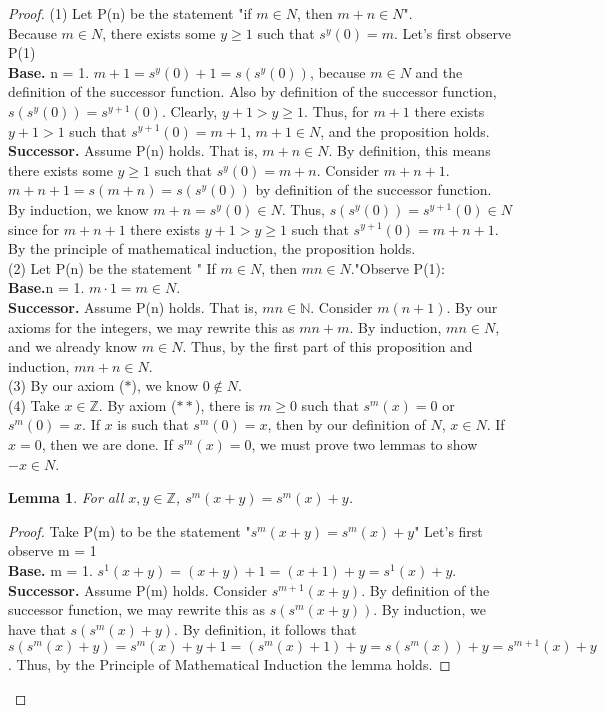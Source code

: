 \documentclass[12pt]{amsart}
\newcommand{\N}{\mathbb{N}}
\newcommand{\Z}{\mathbb{Z}}
\begin{document}
\begin{proof}
	(1) Let P(n) be the statement "if $m \in N$, then $m + n \in N$".\\Because $m \in N$, there exists some $y \geq 1$ such that $ s^y(0) = m$. Let's first observe P(1)
	\\\textbf{Base.} n = 1. $m + 1 = s^y(0) + 1 = s(s^y(0))$, because $m \in N$ and the definition of the successor function. Also by definition of the successor function, $s(s^y(0)) = s^{y+1}(0)$. Clearly, $y+1 > y \geq 1$. Thus, for $m+1$ there exists $y+1 > 1$ such that $s^{y+1}(0) = m+1$, $m+1 \in N$, and the proposition holds.
	\\\textbf{Successor.} Assume P(n) holds. That is, $m + n \in N$. By definition, this means there exists some $y \geq 1$ such that $s^y(0) = m+n$. Consider $m + n + 1$. $m + n + 1 = s(m + n) = s(s^y(0))$ by definition of the successor function. By induction, we know $m + n = s^y(0) \in N$. Thus, $s(s^{y}(0)) = s^{y+1}(0) \in N$ since for $m + n + 1$ there exists $y + 1 > y \geq 1$ such that $s^{y+1}(0) = m + n + 1$. By the principle of mathematical induction, the proposition holds.
	\\\indent (2) Let P(n) be the statement " If $m \in N$, then $mn \in N$."Observe P(1):
	\\\textbf{Base.}n = 1. $m \cdot 1 = m \in N$.
	\\\textbf{Successor.} Assume P(n) holds. That is, $mn \in \N$. Consider $m(n+1)$. By our axioms for the integers, we may rewrite this as $mn + m$. By induction, $mn \in N$, and we already know $m \in N$. Thus, by the first part of this proposition and induction, $mn + n \in N$.
	\\\indent (3) By our axiom ($\ast$), we know $0 \notin N$.
	\\\indent (4) Take $x \in \Z$. By axiom ($\ast\ast$), there is $m \geq 0$ such that $s^m(x) = 0$ or $s^m(0) = x$. If $x$ is such that $s^m(0) = x$, then by our definition of $N$, $x \in N$. If $x = 0$, then we are done. If $s^m(x) = 0$, we must prove two lemmas to show $-x \in N$.
	\newtheorem*{lemma1}{Lemma}
	\begin{lemma1}
		For all $x,y \in \Z$, $s^m(x+y) = s^m(x) + y$.
	\end{lemma1}
	\begin{proof}
		Take P(m) to be the statement "$s^m(x+y) = s^m(x) + y$" Let's first observe m = 1
		\\\textbf{Base.} m = 1. $s^1(x+y) = (x + y) + 1 = (x + 1) + y = s^1(x) + y$.
		\\\textbf{Successor.} Assume P(m) holds. Consider $s^{m+1}(x+y)$. By definition of the successor function, we may rewrite this as $s(s^{m}(x+y))$. By induction, we have that $s(s^m(x) + y)$. By definition, it follows that $s(s^m(x) + y) = s^m(x) + y + 1 = (s^m(x) + 1) + y = s(s^m(x)) + y = s^{m+1}(x) + y$. Thus, by the Principle of Mathematical Induction the lemma holds. 

\end{proof}
\end{proof}
\end{document}
